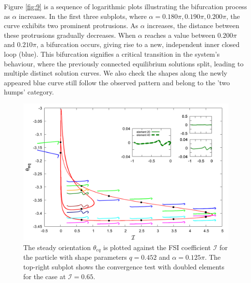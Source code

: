 \documentclass[12pt,MSc,twoside]{muthesis_2020}
\begin{document}
Figure \ref{fig:9} is a sequence of logarithmic plots illustrating the bifurcation process as $\alpha$ increases. In the first three subplots, where $\alpha=0.180\pi,0.190\pi,0.200\pi$, the curve exhibits two prominent protrusions. As $\alpha$ increases, the distance between these protrusions gradually decreases. When $\alpha$ reaches a value between $0.200\pi$ and $0.210\pi$, a bifurcation occurs, giving rise to a new, independent inner closed loop (blue). This bifurcation signifies a critical transition in the system’s behaviour, where the previously connected equilibrium solutions split, leading to multiple distinct solution curves. We also check the shapes along the newly appeared blue curve still follow the observed pattern and belong to the 'two humps' category.

\begin{figure}[!h]
	\begin{center}
		\includegraphics[width=1\textwidth]{plot/combine_elastic_beam_I_theta_q_0.452_alpha_0.125pi_initial_-4.80_0.png}
		\caption{The steady orientation $\theta_{eq}$ is plotted against the FSI coefficient $\mathcal{I}$ for the particle with shape parameters $q = 0.452$ and $\alpha = 0.125\pi$. The top-right subplot shows the convergence test with doubled elements for the case at $\mathcal{I}=0.65$.}
    \label{fig:10}
	\end{center}
\end{figure}
\end{document}
